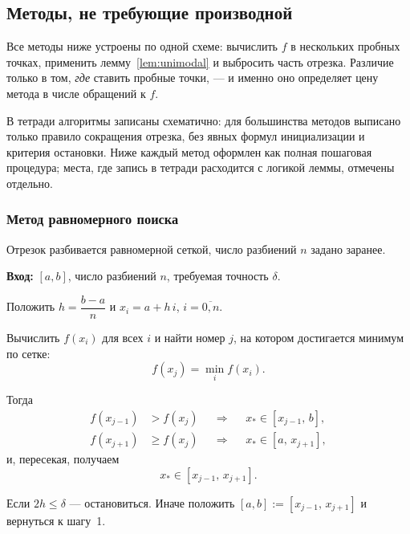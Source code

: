 \subsection{Методы, не требующие производной}
\label{subsec:direct-search-1d}

Все методы ниже устроены по одной схеме: вычислить $f$ в нескольких пробных
точках, применить лемму~\ref{lem:unimodal} и выбросить часть отрезка. Различие
только в том, \emph{где} ставить пробные точки, — и именно оно определяет цену
метода в числе обращений к $f$.

\begin{idea}[title={О форме записи алгоритмов}]
В тетради алгоритмы записаны схематично: для большинства методов выписано
только правило сокращения отрезка, без явных формул инициализации и критерия
остановки. Ниже каждый метод оформлен как полная пошаговая процедура; места,
где запись в тетради расходится с логикой леммы, отмечены отдельно.
\end{idea}

\subsubsection*{Метод равномерного поиска}

Отрезок разбивается равномерной сеткой, число разбиений $n$ задано заранее.

\begin{algo}[title={Метод равномерного поиска}]
\textbf{Вход:} $[a,b]$, число разбиений $n$, требуемая точность $\delta$.

\begin{steps}
  \item Положить $h = \dfrac{b-a}{n}$ и $x_i = a + h\,i$, $i = \overline{0,n}$.
  \item Вычислить $f(x_i)$ для всех $i$ и найти номер $j$, на котором
        достигается минимум по сетке:
        \[
          f(x_j) = \min_{i} f(x_i) .
        \]
  \item Тогда
        \[
          \begin{aligned}
            f(x_{j-1}) &> f(x_j) &&\Longrightarrow&& x_* \in [x_{j-1},\, b] , \\
            f(x_{j+1}) &\ge f(x_j) &&\Longrightarrow&& x_* \in [a,\, x_{j+1}] ,
          \end{aligned}
        \]
        и, пересекая, получаем
        \[
          x_* \in [x_{j-1},\, x_{j+1}] .
        \]
  \item Если $2h \le \delta$ — остановиться. Иначе положить
        $[a,b] := [x_{j-1},\, x_{j+1}]$ и вернуться к шагу~1.
\end{steps}
\end{algo}

